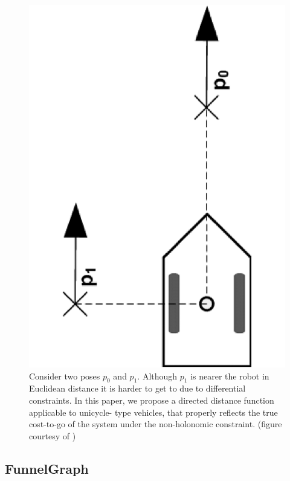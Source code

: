 \begin{figure}
  \centering
  \includegraphics[scale=.2,angle=-90]{figures/rrtfunnel/non-holonomic-vehicle-euclidean-weakness}
  \caption{Consider two poses \(p_0\) and \(p_1\). Although \(p_1\) is nearer
    the robot in Euclidean distance it is harder to get to due to differential
    constraints. In this paper, we propose a directed distance function
    applicable to unicycle- type vehicles, that properly reflects the true
    cost-to-go of the system under the non-holonomic constraint. (figure
    courtesy of \cite{parkFeedbackMotionPlanning2015})}
  \label{fig:non-holonomic-vehicle-euclidean-weakness}
\end{figure}


\subsection{FunnelGraph}

